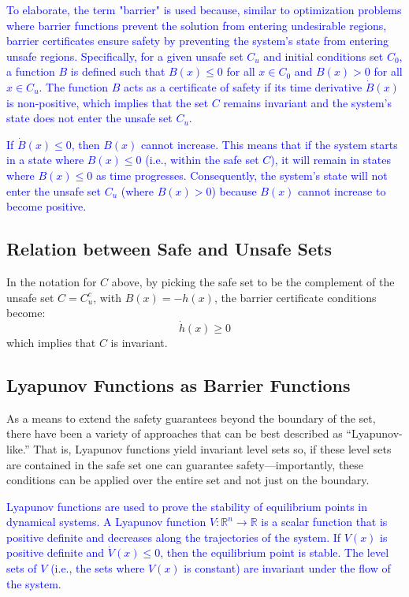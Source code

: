 \documentclass[12pt]{article}
\begin{document}
\textcolor{blue}{
To elaborate, the term "barrier" is used because, similar to optimization problems where barrier functions prevent the solution from entering undesirable regions, barrier certificates ensure safety by preventing the system's state from entering unsafe regions. Specifically, for a given unsafe set \( C_u \) and initial conditions set \( C_0 \), a function \( B \) is defined such that \( B(x) \leq 0 \) for all \( x \in C_0 \) and \( B(x) > 0 \) for all \( x \in C_u \). The function \( B \) acts as a certificate of safety if its time derivative \( \dot{B}(x) \) is non-positive, which implies that the set \( C \) remains invariant and the system's state does not enter the unsafe set \( C_u \).
}

\textcolor{blue}{
If \( \dot{B}(x) \leq 0 \), then \( B(x) \) cannot increase. This means that if the system starts in a state where \( B(x) \leq 0 \) (i.e., within the safe set \( C \)), it will remain in states where \( B(x) \leq 0 \) as time progresses. Consequently, the system's state will not enter the unsafe set \( C_u \) (where \( B(x) > 0 \)) because \( B(x) \) cannot increase to become positive.
}

\subsection{Relation between Safe and Unsafe Sets}
In the notation for \( C \) above, by picking the safe set to be the complement of the unsafe set \( C = C_u^c \), with \( B(x) = -h(x) \), the barrier certificate conditions become:
\[
\dot{h}(x) \geq 0
\]
which implies that \( C \) is invariant.

\subsection{Lyapunov Functions as Barrier Functions}
As a means to extend the safety guarantees beyond the boundary of the set, there have been a variety of approaches that can be best described as “Lyapunov-like.” That is, Lyapunov functions yield invariant level sets so, if these level sets are contained in the safe set one can guarantee safety—importantly, these conditions can be applied over the entire set and not just on the boundary. 

\textcolor{blue}{
Lyapunov functions are used to prove the stability of equilibrium points in dynamical systems. A Lyapunov function \( V : \mathbb{R}^n \to \mathbb{R} \) is a scalar function that is positive definite and decreases along the trajectories of the system. If \( V(x) \) is positive definite and \( \dot{V}(x) \leq 0 \), then the equilibrium point is stable. The level sets of \( V \) (i.e., the sets where \( V(x) \) is constant) are invariant under the flow of the system.
}
\end{document}
